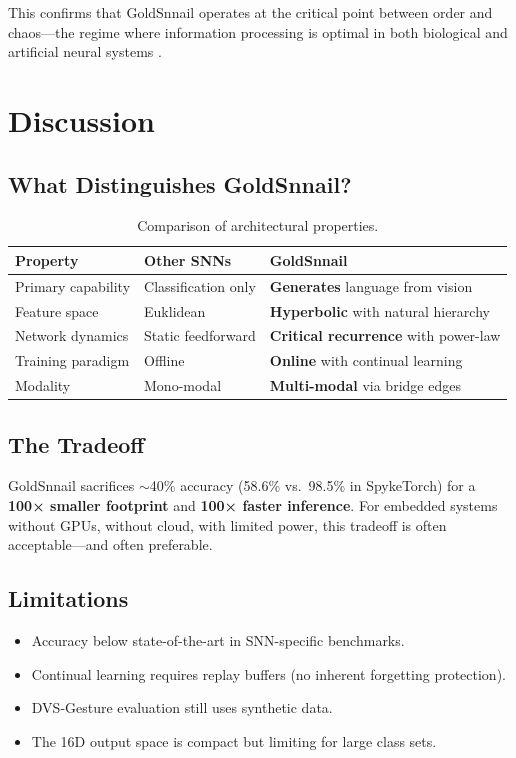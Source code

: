\documentclass[conference]{IEEEtran}
\begin{document}
This confirms that GoldSnnail operates at the critical point between order and chaos---the regime where information processing is optimal in both biological and artificial neural systems \cite{criticality_brain}.

\section{Discussion}

\subsection{What Distinguishes GoldSnnail?}

\begin{table}[h]
\centering
\caption{Comparison of architectural properties.}
\label{tab:comparison}
\begin{tabular}{lll}
\toprule
\textbf{Property} & \textbf{Other SNNs} & \textbf{GoldSnnail} \\
\midrule
Primary capability & Classification only & \textbf{Generates} language from vision \\
Feature space & Euklidean & \textbf{Hyperbolic} with natural hierarchy \\
Network dynamics & Static feedforward & \textbf{Critical recurrence} with power-law \\
Training paradigm & Offline & \textbf{Online} with continual learning \\
Modality & Mono-modal & \textbf{Multi-modal} via bridge edges \\
\bottomrule
\end{tabular}
\end{table}

\subsection{The Tradeoff}
GoldSnnail sacrifices $\sim$40\% accuracy (58.6\% vs.\ 98.5\% in SpykeTorch) for a \textbf{100× smaller footprint} and \textbf{100× faster inference}. For embedded systems without GPUs, without cloud, with limited power, this tradeoff is often acceptable---and often preferable.

\subsection{Limitations}
\begin{itemize}
    \item Accuracy below state-of-the-art in SNN-specific benchmarks.
    \item Continual learning requires replay buffers (no inherent forgetting protection).
    \item DVS-Gesture evaluation still uses synthetic data.
    \item The 16D output space is compact but limiting for large class sets.
\end{itemize}
\end{document}
